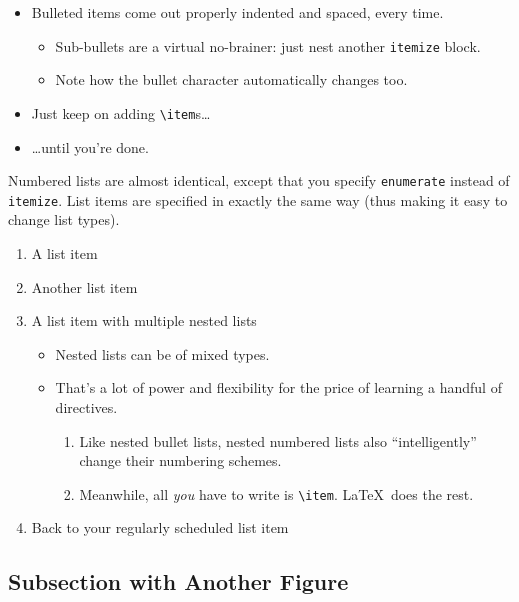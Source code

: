 \documentclass{article}
\begin{document}
\begin{itemize}
\item Bulleted items come out properly indented and spaced, every time.

\begin{itemize}
\item Sub-bullets are a virtual no-brainer: just nest another \verb!itemize! block.
\item Note how the bullet character automatically changes too.
\end{itemize}

\item Just keep on adding \verb!\item!s\ldots

\item \ldots until you're done.
\end{itemize}

Numbered lists are almost identical, except that you specify \verb!enumerate! instead of \verb!itemize!.  List items are specified in exactly the same way (thus making it easy to change list types).

\begin{enumerate}
\item A list item
\item Another list item
\item A list item with multiple nested lists

\begin{itemize}
\item Nested lists can be of mixed types.
\item That's a lot of power and flexibility for the price of learning a handful of directives.

\begin{enumerate}
\item Like nested bullet lists, nested numbered lists also ``intelligently'' change their numbering schemes.
\item Meanwhile, all \emph{you} have to write is \verb!\item!.  \LaTeX\ does the rest.
\end{enumerate}
\end{itemize}

\item Back to your regularly scheduled list item

\end{enumerate}

\subsection{Subsection with Another Figure}
\end{document}
